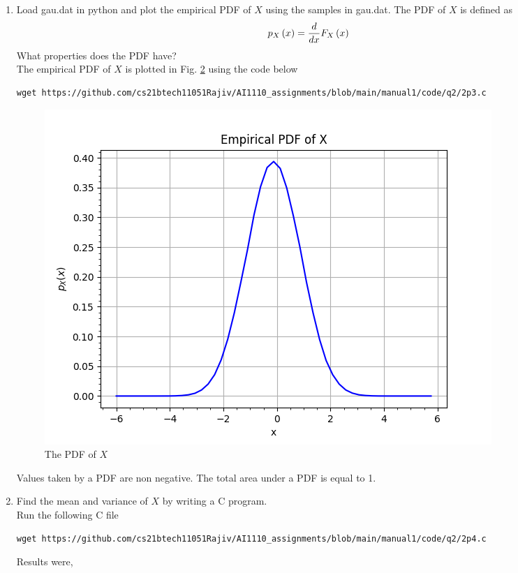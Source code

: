 \documentclass[journal,12pt,twocolumn]{IEEEtran}
\renewcommand\thesection{\arabic{section}}
\begin{document}
\begin{enumerate}[label=\thesection.\arabic*
,ref=\thesection.\theenumi]
\begin{figure}[ht!]
\caption{The CDF of $X$}
\label{fig:gauss_cdf}
\end{figure}
A CDF is a non-decreasing function. 
Its value varies from 0 to 1.
It is continuous if PDF has finite values.
%
\item
Load gau.dat in python and plot the empirical PDF of $X$ using the samples in gau.dat. The PDF of $X$ is defined as
\begin{align}
p_{X}\left(x\right) = \frac{d}{dx}F_{X}\left(x\right)
\label{eq:pdf_cdf}
\end{align}
What properties does the PDF have?
\\
\solution The empirical PDF of $X$ is plotted in Fig. \ref{fig:gauss_pdf} using the code below
\begin{lstlisting}
wget https://github.com/cs21btech11051Rajiv/AI1110_assignments/blob/main/manual1/code/q2/2p3.c
\end{lstlisting}
\begin{figure}[ht!]
\centering
\includegraphics[width=\columnwidth]{./figs/fig2.3.png}
\caption{The PDF of $X$}
\label{fig:gauss_pdf}
\end{figure}
Values taken by a PDF are non negative. The total area under a PDF is equal to 1. 
%
\item Find the mean and variance of $X$ by writing a C program.
\\
\solution Run the following C file
\begin{lstlisting}
wget https://github.com/cs21btech11051Rajiv/AI1110_assignments/blob/main/manual1/code/q2/2p4.c
\end{lstlisting}
Results were, 
\begin{align}

\end{align}
\end{enumerate}
\end{document}
